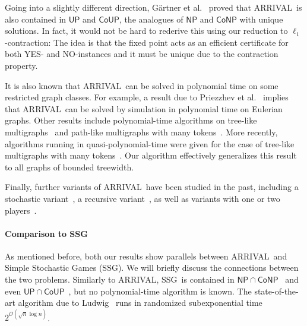 \documentclass[a4paper,UKenglish,cleveref, autoref, thm-restate]{lipics-v2021}
\newcommand{\NP}{\mathsf{NP}}
\newcommand{\CoNP}{\mathsf{CoNP}}
\newcommand{\UP}{\mathsf{UP}}
\newcommand{\CoUP}{\mathsf{CoUP}}
\newcommand{\bigO}{\mathcal{O}}
\newcommand{\problem}[1]{\textrm{#1}}
\newcommand{\arrival}{\problem{ARRIVAL}}
\newcommand{\ssg}{\problem{SSG}}
\begin{document}
Going into a slightly different direction, Gärtner et al.\@~\cite{gartnerARRIVALNextStop2018} proved that \arrival\ is also contained in $\UP$ and $\CoUP$, the analogues of $\NP$ and $\CoNP$ with unique solutions. 
In fact, it would not be hard to rederive this using our reduction to $\ell_1$-contraction: The idea is that the fixed point acts as an efficient certificate for both YES- and NO-instances and it must be unique due to the contraction property.

It is also known that \arrival\ can be solved in polynomial time on some restricted graph classes. For example, a result due to Priezzhev et al.\@~\cite{priezzhevEulerianWalkersModel1996} implies that \arrival\ can be solved by simulation in polynomial time on Eulerian graphs. Other results include polynomial-time algorithms on tree-like multigraphs~\cite{augerPolynomialTimeAlgorithm2022} and path-like multigraphs with many tokens~\cite{augerGeneralizedARRIVALProblem2023}. More recently, algorithms running in quasi-polynomial-time were given for the case of tree-like multigraphs with many tokens~\cite{ghorbaniQuasiPolynomialTimeAlgorithm2025}. Our algorithm effectively generalizes this result to all graphs of bounded treewidth.

Finally, further variants of \arrival\ have been studied in the past, including a stochastic variant~\cite{websterStochasticArrivalProblem2022}, a recursive variant~\cite{websterRecursiveArrivalProblem2023}, as well as variants with one or two players~\cite{fearnleyReachabilitySwitchingGames2021}.

\paragraph*{Comparison to \ssg\ }

As mentioned before, both our results show parallels between \arrival\ and Simple Stochastic Games (\ssg). We will briefly discuss the connections between the two problems. 
Similarly to \arrival, \ssg\ is contained in $\NP \cap \CoNP$~\cite{condonComplexityStochasticGames1992} and even $\UP \cap \CoUP$~\cite{chatterjeeReductionParityGames2011a}, but no polynomial-time algorithm is known. The state-of-the-art algorithm due to Ludwig~\cite{ludwigSubexponentialRandomizedAlgorithm1995} runs in randomized subexponential time $2^{\bigO(\sqrt{n}\log n)}$.
\end{document}
